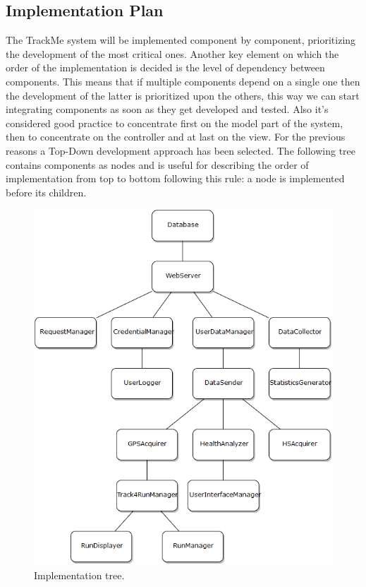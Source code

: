 \subsection{Implementation Plan}
The TrackMe system will be implemented component by component, prioritizing the development of the most critical ones. Another key element on which the order of the implementation is decided is the level of dependency between components. This means that if multiple components depend on a single one then the development of the latter is prioritized upon the others, this way we can start integrating components as soon as they get developed and tested. Also it's considered good practice to concentrate first on the model part of the system, then to concentrate on the controller and at last on the view. For the previous reasons a Top-Down development approach has been selected.
\medbreak
\noindent
The following tree contains components as nodes and is useful for describing the order of implementation from top to bottom following this rule: a node is implemented before its children.

\begin{figure}[H]
\centering
\includegraphics[scale=0.5]{Images/ImplementationPlan.png}
\caption{Implementation tree.}
\end{figure}

